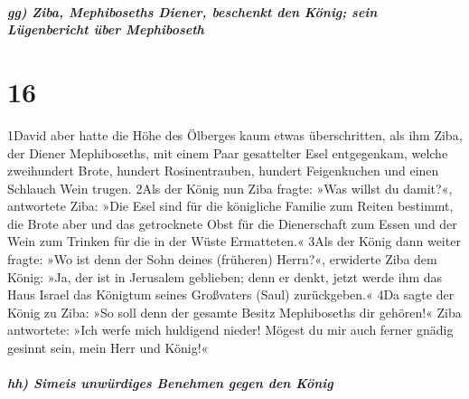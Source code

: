 \hypertarget{gg-ziba-mephiboseths-diener-beschenkt-den-kuxf6nig-sein-luxfcgenbericht-uxfcber-mephiboseth}{%
\subparagraph{gg) Ziba, Mephiboseths Diener, beschenkt den König; sein
Lügenbericht über
Mephiboseth}\label{gg-ziba-mephiboseths-diener-beschenkt-den-kuxf6nig-sein-luxfcgenbericht-uxfcber-mephiboseth}}

\hypertarget{section-15}{%
\section{16}\label{section-15}}

1David aber hatte die Höhe des Ölberges kaum etwas überschritten, als
ihm Ziba, der Diener Mephiboseths, mit einem Paar gesattelter Esel
entgegenkam, welche zweihundert Brote, hundert Rosinentrauben, hundert
Feigenkuchen und einen Schlauch Wein trugen. 2Als der König nun Ziba
fragte: »Was willst du damit?«, antwortete Ziba: »Die Esel sind für die
königliche Familie zum Reiten bestimmt, die Brote aber und das
getrocknete Obst für die Dienerschaft zum Essen und der Wein zum Trinken
für die in der Wüste Ermatteten.« 3Als der König dann weiter fragte: »Wo
ist denn der Sohn deines (früheren) Herrn?«, erwiderte Ziba dem König:
»Ja, der ist in Jerusalem geblieben; denn er denkt, jetzt werde ihm das
Haus Israel das Königtum seines Großvaters (Saul) zurückgeben.« 4Da
sagte der König zu Ziba: »So soll denn der gesamte Besitz Mephiboseths
dir gehören!« Ziba antwortete: »Ich werfe mich huldigend nieder! Mögest
du mir auch ferner gnädig gesinnt sein, mein Herr und König!«

\hypertarget{hh-simeis-unwuxfcrdiges-benehmen-gegen-den-kuxf6nig}{%
\subparagraph{hh) Simeis unwürdiges Benehmen gegen den
König}\label{hh-simeis-unwuxfcrdiges-benehmen-gegen-den-kuxf6nig}}

